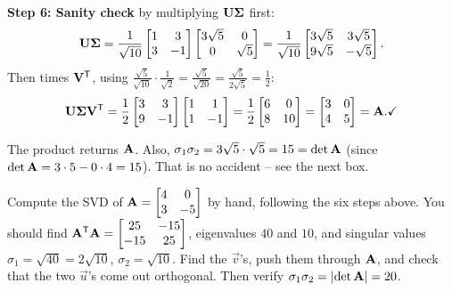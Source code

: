\textbf{Step 6: Sanity check} by multiplying $\mathbf{U}\mathbf{\Sigma}$ first:
\[
  \mathbf{U}\mathbf{\Sigma}
  = \frac{1}{\sqrt{10}}\begin{bmatrix} 1 & 3 \\ 3 & -1 \end{bmatrix}
    \begin{bmatrix} 3\sqrt5 & 0 \\ 0 & \sqrt5 \end{bmatrix}
  = \frac{1}{\sqrt{10}}\begin{bmatrix} 3\sqrt5 & 3\sqrt5 \\ 9\sqrt5 & -\sqrt5 \end{bmatrix}.
\]
Then times $\mathbf{V}^{\mathsf{T}}$, using $\frac{\sqrt5}{\sqrt{10}}\cdot\frac{1}{\sqrt2} =
\frac{\sqrt5}{\sqrt{20}} = \frac{\sqrt5}{2\sqrt5} = \frac12$:
\[
  \mathbf{U}\mathbf{\Sigma}\mathbf{V}^{\mathsf{T}}
  = \frac12\begin{bmatrix} 3 & 3 \\ 9 & -1 \end{bmatrix}
           \begin{bmatrix} 1 & 1 \\ 1 & -1 \end{bmatrix}
  = \frac12\begin{bmatrix} 6 & 0 \\ 8 & 10 \end{bmatrix}
  = \begin{bmatrix} 3 & 0 \\ 4 & 5 \end{bmatrix} = \mathbf{A}. \checkmark
\]

The product returns $\mathbf{A}$. Also, $\sigma_1\sigma_2 = 3\sqrt5\cdot\sqrt5 = 15
= \det\mathbf{A}$ (since $\det\mathbf{A} = 3\cdot5 - 0\cdot4 = 15$). That is no
accident -- see the next box.

\begin{labbox}
Compute the SVD of $\mathbf{A} = \begin{bmatrix} 4 & 0 \\ 3 & -5\end{bmatrix}$ by
hand, following the six steps above. You should find $\mathbf{A}^{\mathsf{T}}\mathbf{A} =
\begin{bmatrix} 25 & -15 \\ -15 & 25\end{bmatrix}$, eigenvalues $40$ and $10$, and
singular values $\sigma_1 = \sqrt{40} = 2\sqrt{10}$, $\sigma_2 = \sqrt{10}$. Find
the $\vec{v}$'s, push them through $\mathbf{A}$, and check that the two $\vec{u}$'s
come out orthogonal. Then verify $\sigma_1\sigma_2 = \lvert\det\mathbf{A}\rvert = 20$.
\end{labbox}

